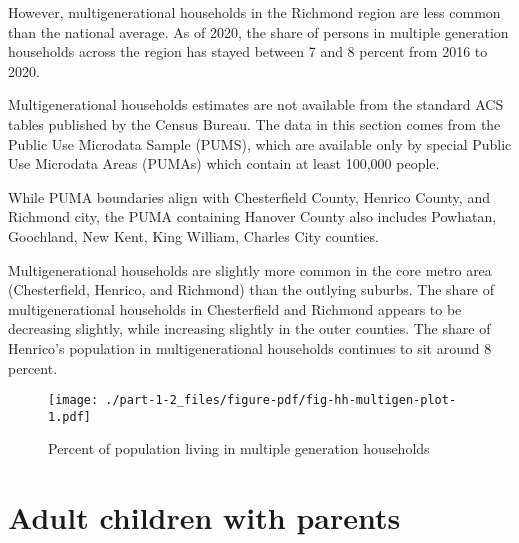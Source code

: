 \documentclass[
  letterpaper,
  DIV=11,
  numbers=noendperiod]{scrreprt}
\begin{document}
However, multigenerational households in the Richmond region are less
common than the national average. As of 2020, the share of persons in
multiple generation households across the region has stayed between 7
and 8 percent from 2016 to 2020.

\begin{tcolorbox}[enhanced jigsaw, colback=white, colbacktitle=quarto-callout-note-color!10!white, bottomrule=.15mm, opacitybacktitle=0.6, colframe=quarto-callout-note-color-frame, breakable, opacityback=0, bottomtitle=1mm, titlerule=0mm, coltitle=black, leftrule=.75mm, left=2mm, title=\textcolor{quarto-callout-note-color}{\faInfo}\hspace{0.5em}{Note}, toptitle=1mm, arc=.35mm, rightrule=.15mm, toprule=.15mm]
Multigenerational households estimates are not available from the
standard ACS tables published by the Census Bureau. The data in this
section comes from the Public Use Microdata Sample (PUMS), which are
available only by special Public Use Microdata Areas (PUMAs) which
contain at least 100,000 people.

While PUMA boundaries align with Chesterfield County, Henrico County,
and Richmond city, the PUMA containing Hanover County also includes
Powhatan, Goochland, New Kent, King William, Charles City counties.
\end{tcolorbox}

Multigenerational households are slightly more common in the core metro
area (Chesterfield, Henrico, and Richmond) than the outlying suburbs.
The share of multigenerational households in Chesterfield and Richmond
appears to be decreasing slightly, while increasing slightly in the
outer counties. The share of Henrico's population in multigenerational
households continues to sit around 8 percent.

\begin{figure}

{\centering \texttt{[image: ./part-1-2\_files/figure-pdf/fig-hh-multigen-plot-1.pdf]}

}

\caption{\label{fig-hh-multigen-plot}Percent of population living in
multiple generation households}

\end{figure}

\hypertarget{adult-children-with-parents}{%
\section{Adult children with
parents}\label{adult-children-with-parents}}
\end{document}
